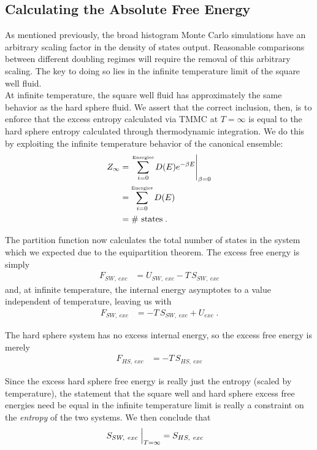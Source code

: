 \documentclass[12pt]{article}
\begin{document}
\subsection{Calculating the Absolute Free Energy}
As mentioned previously, the broad histogram Monte Carlo simulations have an arbitrary scaling factor in the density of states output. Reasonable comparisons between different doubling regimes will require  the removal of this arbitrary scaling. The key to doing so lies in the infinite temperature limit of the square well fluid.\\

At infinite temperature, the square well fluid has approximately the same behavior as the hard sphere fluid. We assert that the correct inclusion, then, is to enforce that the excess entropy calculated via TMMC at $T=\infty$ is equal to the hard sphere entropy calculated through thermodynamic integration. We do this by exploiting the infinite temperature behavior of the canonical ensemble:
\begin{align}
    Z_{\infty} &= \left.\sum_{i=0}^{\text{\tiny Energies}} D(E) e^{-\beta E}\right|_{\beta = 0}\\
    &= \sum_{i=0}^{\text{\tiny Energies}} D(E)\\
    &= \#\text{~states}\;.
\end{align}

The partition function now calculates the total number of states in the system which we expected due to the equipartition theorem. The excess free energy is simply
\begin{align}
    F_{SW,~exc} &= U_{SW,~exc} - T\,S_{SW,~exc}     
\end{align} 
and, at infinite temperature, the internal energy asymptotes to a value independent of temperature, leaving us with
\begin{align}
    F_{SW,~exc} &= -T\,S_{SW, ~exc} + U_{exc}\;.
\end{align}

The hard sphere system has no excess internal energy, so the excess free energy is merely
\begin{align}
     F_{HS,~exc} &= -T\,S_{HS,~exc} 
\end{align} 

Since the excess hard sphere free energy is really just the entropy \cite{valeskethesis} (scaled by temperature), the statement that the square well and hard sphere excess free energies need be equal in the infinite temperature limit is really a constraint on the {\it entropy} of the two systems. We then conclude that
\begin{align}
    S_{SW,~exc} \Bigm\lvert_{T=\infty} &= S_{HS,~exc}
\end{align}
\end{document}
